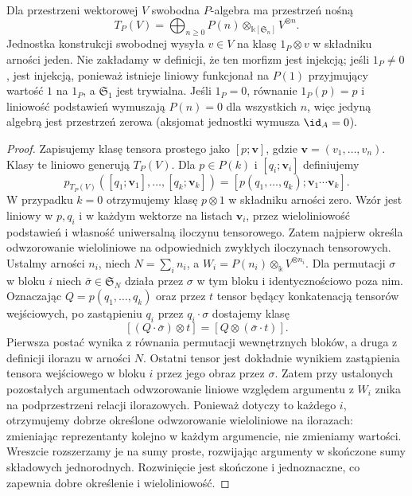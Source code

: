 \begin{twierdzenie}\label{cat:thm:free-linear-operad-algebra}
Dla przestrzeni wektorowej $V$ swobodna $P$-algebra ma przestrzeń nośną
\[
 T_P(V)=\bigoplus_{n\geq0}
 P(n)\otimes_{\mathbb k[\mathfrak S_n]} V^{\otimes n}.
\]
Jednostka konstrukcji swobodnej wysyła $v\in V$ na klasę $1_P\otimes v$ w składniku arności jeden. Nie zakładamy w definicji, że ten morfizm jest injekcją; jeśli $1_P\ne0$, jest injekcją, ponieważ istnieje liniowy funkcjonał na $P(1)$ przyjmujący wartość $1$ na $1_P$, a $\mathfrak S_1$ jest trywialna. Jeśli $1_P=0$, równanie $1_P(p)=p$ i liniowość podstawień wymuszają $P(n)=0$ dla wszystkich $n$, więc jedyną algebrą jest przestrzeń zerowa (aksjomat jednostki wymusza $\id_A=0$).
\end{twierdzenie}
\begin{proof}
Zapisujemy klasę tensora prostego jako $[p;\mathbf v]$, gdzie $\mathbf v=(v_1,\ldots,v_n)$. Klasy te liniowo generują $T_P(V)$. Dla $p\in P(k)$ i $[q_i;\mathbf v_i]$ definiujemy
\[
 p_{T_P(V)}([q_1;\mathbf v_1],\ldots,[q_k;\mathbf v_k])
 =[p(q_1,\ldots,q_k);\mathbf v_1\cdots\mathbf v_k].
\]
W przypadku $k=0$ otrzymujemy klasę $p\otimes1$ w składniku arności zero. Wzór jest liniowy w $p,q_i$ i w każdym wektorze na listach $\mathbf v_i$, przez wieloliniowość podstawień i własność uniwersalną iloczynu tensorowego. Zatem najpierw określa odwzorowanie wieloliniowe na odpowiednich zwykłych iloczynach tensorowych. Ustalmy arności $n_i$, niech $N=\sum_i n_i$, a $W_i=P(n_i)\otimes_{\mathbb k}V^{\otimes n_i}$. Dla permutacji $\sigma$ w bloku $i$ niech $\bar\sigma\in\mathfrak S_N$ działa przez $\sigma$ w tym bloku i identycznościowo poza nim. Oznaczając $Q=p(q_1,\ldots,q_k)$ oraz przez $t$ tensor będący konkatenacją tensorów wejściowych, po zastąpieniu $q_i$ przez $q_i\cdot\sigma$ dostajemy klasę
\[
 [ (Q\cdot\bar\sigma)\otimes t]
 =[Q\otimes(\bar\sigma\cdot t)].
\]
Pierwsza postać wynika z równania permutacji wewnętrznych bloków, a druga z definicji ilorazu w arności $N$. Ostatni tensor jest dokładnie wynikiem zastąpienia tensora wejściowego w bloku $i$ przez jego obraz przez $\sigma$. Zatem przy ustalonych pozostałych argumentach odwzorowanie liniowe względem argumentu z $W_i$ znika na podprzestrzeni relacji ilorazowych. Ponieważ dotyczy to każdego $i$, otrzymujemy dobrze określone odwzorowanie wieloliniowe na ilorazach: zmieniając reprezentanty kolejno w każdym argumencie, nie zmieniamy wartości. Wreszcie rozszerzamy je na sumy proste, rozwijając argumenty w skończone sumy składowych jednorodnych. Rozwinięcie jest skończone i jednoznaczne, co zapewnia dobre określenie i wieloliniowość.


\end{proof}
